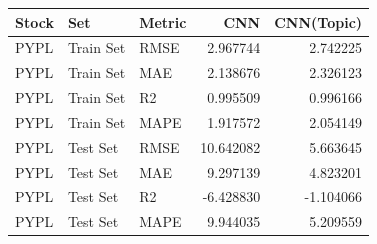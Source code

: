 \begin{tabular}{lllrr}
\toprule
Stock & Set & Metric & CNN & CNN(Topic) \\
\midrule
PYPL & Train Set & RMSE & 2.967744 & 2.742225 \\
PYPL & Train Set & MAE & 2.138676 & 2.326123 \\
PYPL & Train Set & R2 & 0.995509 & 0.996166 \\
PYPL & Train Set & MAPE & 1.917572 & 2.054149 \\
PYPL & Test Set & RMSE & 10.642082 & 5.663645 \\
PYPL & Test Set & MAE & 9.297139 & 4.823201 \\
PYPL & Test Set & R2 & -6.428830 & -1.104066 \\
PYPL & Test Set & MAPE & 9.944035 & 5.209559 \\
\bottomrule
\end{tabular}
